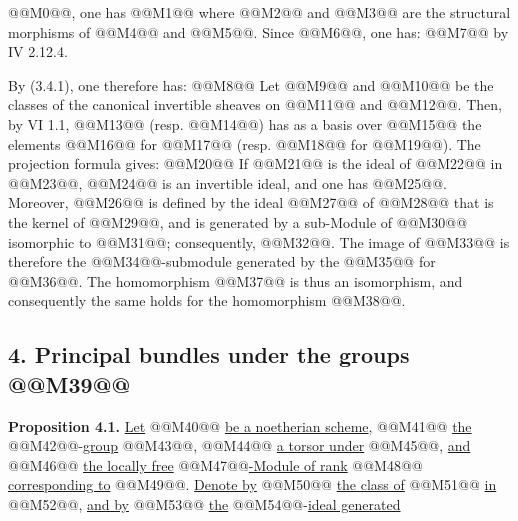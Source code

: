 
@@M0@@, one has
@@M1@@
where @@M2@@ and @@M3@@ are the structural morphisms of @@M4@@ and @@M5@@. Since @@M6@@, one has:
@@M7@@
by IV 2.12.4.

By (3.4.1), one therefore has:
@@M8@@
Let @@M9@@ and @@M10@@ be the classes of the canonical invertible sheaves on @@M11@@ and @@M12@@. Then, by VI 1.1, @@M13@@ (resp. @@M14@@) has as a basis over @@M15@@ the elements @@M16@@ for @@M17@@ (resp. @@M18@@ for @@M19@@). The projection formula gives:
@@M20@@
If @@M21@@ is the ideal of @@M22@@ in @@M23@@, @@M24@@ is an invertible ideal, and one has @@M25@@. Moreover, @@M26@@ is defined by the ideal @@M27@@ of @@M28@@ that is the kernel of @@M29@@, and is generated by a sub-Module of @@M30@@ isomorphic to @@M31@@; consequently, @@M32@@. The image of @@M33@@ is therefore the @@M34@@-submodule generated by the @@M35@@ for @@M36@@. The homomorphism @@M37@@ is thus an isomorphism, and consequently the same holds for the homomorphism @@M38@@.

\subsection*{4. Principal bundles under the groups @@M39@@}

\textbf{Proposition 4.1.} \uline{Let} @@M40@@ \uline{be a noetherian scheme}, @@M41@@ \uline{the} @@M42@@-\uline{group} @@M43@@, @@M44@@ \uline{a torsor under} @@M45@@, \uline{and} @@M46@@ \uline{the locally free} @@M47@@\uline{-Module of rank} @@M48@@ \uline{corresponding to} @@M49@@. \uline{Denote by} @@M50@@ \uline{the class of} @@M51@@ \uline{in} @@M52@@, \uline{and by} @@M53@@ \uline{the} @@M54@@-\uline{ideal generated}

